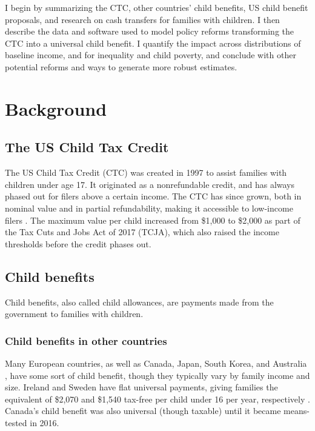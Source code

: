 \documentclass[12pt]{article}
\begin{document}
I begin by summarizing the CTC, other countries' child benefits, US child benefit proposals, and research on cash transfers for families with children. I then describe the data and software used to model policy reforms transforming the CTC into a universal child benefit. I quantify the impact across distributions of baseline income, and for inequality and child poverty, and conclude with other potential reforms and ways to generate more robust estimates.


\section{Background} \label{sec:literature}

\subsection{The US Child Tax Credit}

The US Child Tax Credit (CTC) was created in 1997 to assist families with children under age 17. It originated as a nonrefundable credit, and has always phased out for filers above a certain income. The CTC has since grown, both in nominal value and in partial refundability, making it accessible to low-income filers \cite{crandall-hollick}. The maximum value per child increased from \$1,000 to \$2,000 as part of the Tax Cuts and Jobs Act of 2017 (TCJA), which also raised the income thresholds before the credit phases out.

\subsection{Child benefits}

Child benefits, also called child allowances, are payments made from the government to families with children.

\subsubsection{Child benefits in other countries}

Many European countries, as well as Canada, Japan, South Korea, and Australia \cite{wikipedia_child_benefit}, have some sort of child benefit, though they typically vary by family income and size. Ireland and Sweden have flat universal payments, giving families the equivalent of \$2,070 and \$1,540 tax-free per child under 16 per year, respectively \cite{citizensinformation,sweden_child_allowance}. Canada's child benefit was also universal (though taxable) until it became means-tested in 2016.
\end{document}
